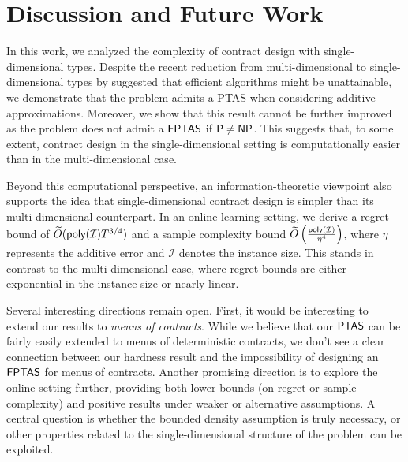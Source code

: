\section{Discussion and Future Work}
In this work, we analyzed the complexity of contract design with single-dimensional types. Despite the recent reduction from multi-dimensional to single-dimensional types by \citet{castiglioni2025reduction} suggested that efficient algorithms might be unattainable, we demonstrate that the problem admits a PTAS when considering additive approximations. Moreover, we show that this result cannot be further improved as the problem does not admit a $\textsf{FPTAS}$ if $\textsf{P}\neq\textsf{NP}$. This suggests that, to some extent, contract design in the single-dimensional setting is computationally easier than in the multi-dimensional case.
%


Beyond this computational perspective, an information-theoretic viewpoint also supports the idea that single-dimensional contract design is simpler than its multi-dimensional counterpart.
In an online learning setting, we derive a regret bound of $\widetilde O(\textsf{poly}(\mathcal I)T^{3/4})$ and a sample complexity bound $\widetilde O\left(\frac{\textsf{poly}(\mathcal I)}{\eta^4}\right)$, where $\eta$ represents the additive error and $\mathcal I$ denotes the instance size.
%
This stands in contrast to the multi-dimensional case, where regret bounds are either exponential in the instance size or nearly linear.

Several interesting directions remain open.
First, it would be interesting to extend our results to \emph{menus of contracts}. 
While we believe that our $\textsf{PTAS}$ can be fairly easily extended to menus of deterministic contracts, we don't see a clear connection between our hardness result and the impossibility of designing an $\textsf{FPTAS}$ for menus of contracts. 
%
Another promising direction is to explore the online setting further, providing both lower bounds (on regret or sample complexity) and positive results under weaker or alternative assumptions. 
A central question is whether the bounded density assumption is truly necessary, or other properties related to the single-dimensional structure of the problem can be exploited. 

